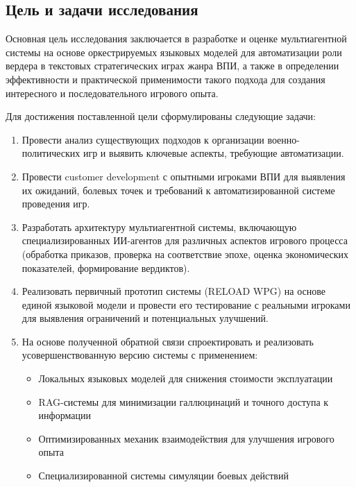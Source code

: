 \subsection{Цель и задачи исследования}

Основная цель исследования заключается в разработке и оценке мультиагентной системы на основе оркестрируемых языковых моделей для автоматизации роли вердера в текстовых стратегических играх жанра ВПИ, а также в определении эффективности и практической применимости такого подхода для создания интересного и последовательного игрового опыта.

Для достижения поставленной цели сформулированы следующие задачи:

\begin{enumerate}
    \item Провести анализ существующих подходов к организации военно-политических игр и выявить ключевые аспекты, требующие автоматизации.

    \item Провести customer development с опытными игроками ВПИ для выявления их ожиданий, болевых точек и требований к автоматизированной системе проведения игр.

    \item Разработать архитектуру мультиагентной системы, включающую специализированных ИИ-агентов для различных аспектов игрового процесса (обработка приказов, проверка на соответствие эпохе, оценка экономических показателей, формирование вердиктов).

    \item Реализовать первичный прототип системы (RELOAD WPG) на основе единой языковой модели и провести его тестирование с реальными игроками для выявления ограничений и потенциальных улучшений.

    \item На основе полученной обратной связи спроектировать и реализовать усовершенствованную версию системы с применением:
    \begin{itemize}
        \item Локальных языковых моделей для снижения стоимости эксплуатации
        \item RAG-системы для минимизации галлюцинаций и точного доступа к информации
        \item Оптимизированных механик взаимодействия для улучшения игрового опыта
        \item Специализированной системы симуляции боевых действий
    \end{itemize}


\end{enumerate}
